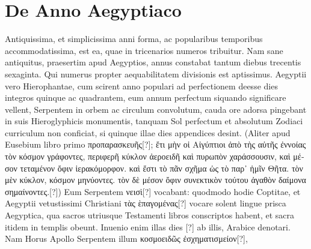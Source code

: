 \section{De Anno Aegyptiaco}
%
Antiquissima, et simplicissima anni forma, ac popularibus
temporibus accommodatissima, est ea, quae in tricenarios
numeros tribuitur.
Nam sane antiquitus, praesertim apud
Aegyptios, annus constabat tantum diebus trecentis sexaginta.
Qui numerus
propter aequabilitatem divisionis est aptissimus.
Aegyptii vero
Hierophantae, cum scirent anno populari ad perfectionem deesse dies
integros quinque ac quadrantem, eum annum perfectum siquando
significare vellent, Serpentem in orbem ac circulum convolutum,
cauda ore adorsa pingebant in suis Hieroglyphicis monumentis,
tanquam Sol perfectum et absolutum Zodiaci curriculum non conficiat,
si quinque illae dies appendices desint.
(Aliter apud Eusebium
libro primo \textgreek{προπαρασκευῆς}[?];
\textgreek{ἔτι μὴν οἱ Αἰγύπτιοι ἀπὸ τὴς αὐτῆς ἐννοίας
τὸν κόσμον γράφοντες, περιφερῆ κύκλον ἀεροειδῆ καὶ πυρωπὸν χαράσσουσιν, καὶ μέσον
τεταμένον ὄφιν ἱερακόμορφον. καὶ ἔστι τὸ πᾶν σχῆμα ὡς τὸ παρ᾽ ἡμῖν Θῆτα.
τὸν μὲν κύκλον, κόσμον μηνύοντες. τὸν δὲ μέσον ὄφιν συνεκτικὸν τούτου ἀγαθὸν
δαίμονα σημαίνοντες.}[?])
Eum Serpentem \textgreek{νεισὶ}[?] vocabant: quodmodo hodie
Coptitae, et Aegyptii vetustissimi Christiani
 \textgreek{τὰς ὲπαγομένας}[?] vocare
solent lingue prisca Aegyptica, qua sacros utriusque Testamenti
libros conscriptos habent, et sacra itidem in templis obeunt.
Inuenio enim illas dies \textarabic{}[?] ab illis, Arabice denotari.
Nam Horus
Apollo Serpentem illum \textgreek{κοσμοειδῶς ἐσχηματισμείον}[?],
